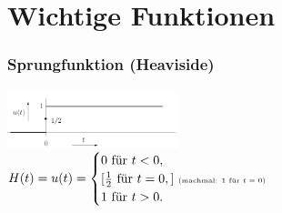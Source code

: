 



\section{Wichtige Funktionen}

\begin{multicols}{2}
  \small
  \subsubsection*{Sprungfunktion (Heaviside)}
  \includegraphics[width = 5cm]{include/Wichtige Funktionen/img/Sprungfunktion.png}
  \\ $H(t) = u(t) = \begin{cases}
      0 \textrm{ für }  t<0,                                                     \\
      [\frac{1}{2} \textrm{ für }  t = 0,] \textrm{ \tiny(machmal: 1 für $t=0$)} \\
      1 \textrm{ für }  t >0.
    \end{cases}   $
  \\

\end{multicols}
